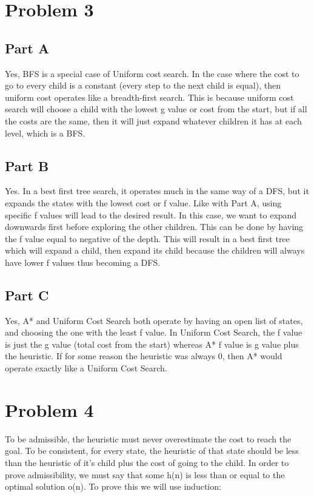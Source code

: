 \documentclass[12pt]{article}
\begin{document}
	\section*{Problem 3}
		\subsection*{Part A}
			Yes, BFS is a special case of Uniform cost search. In the case where the cost to go to every child is a constant (every step to the next child is equal), then uniform cost operates like a breadth-first search. This is because uniform cost search will choose a child with the lowest g value or cost from the start, but if all the costs are the same, then it will just expand whatever children it has at each level, which is a BFS.
		\subsection*{Part B}
			Yes. In a best first tree search, it operates much in the same way of a DFS, but it expands the states with the lowest cost or f value. Like with Part A, using specific f values will lead to the desired result. In this case, we want to expand downwards first before exploring the other children. This can be done by having the f value equal to negative of the depth. This will result in a best first tree which will expand a child, then expand its child because the children will always have lower f values thus becoming a DFS.
		\subsection*{Part C}
			Yes, A* and Uniform Cost Search both operate by having an open list of states, and choosing the one with the least f value. In Uniform Cost Search, the f value is just the g value (total cost from the start) whereas A* f value is g value plus the heuristic. If for some reason the heuristic was always 0, then A* would operate exactly like a Uniform Cost Search.
			
	\section*{Problem 4}
		To be admissible, the heuristic must never overestimate the cost to reach the goal. To be consistent, for every state, the heuristic of that state should be less than the heuristic of it’s child plus the cost of going to the child. In order to prove admissibility, we must say that some h(n) is less than or equal to the optimal solution o(n). To prove this we will use induction: \\
		
\end{document}
